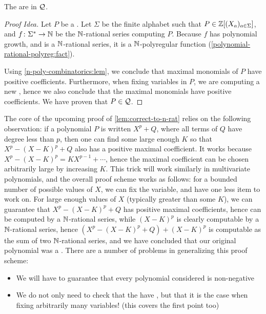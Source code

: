 \documentclass[a4paper,11pt]{article}
\begin{document}
\begin{lemma}
    The  are in $\mathcal{Q}$.
\end{lemma}
\begin{proof}[Proof Idea]
    Let $P$ be a .
    Let $\Sigma$  be the finite alphabet such that
    $P \in \mathbb{Z}[(X_a)_{a \in \Sigma}]$,
    and $f \colon \Sigma^* \to \mathbb{N}$ be the 
    $\mathbb{N}$-rational series computing $P$.
    Because $f$ has polynomial growth, and is a $\mathbb{N}$-rational series,
    it is a $\mathbb{N}$-polyregular function 
    (\cref{polynomial-rational-polyreg:fact}).

    Using \cref{n-poly-combinatorics:lem},
    we conclude that maximal monomials of $P$ have
    positive coefficients. Furthermore, when fixing variables
    in $P$, we are computing a new ,
    hence we also conclude that the maximal monomials have
    positive coefficients.
    We have proven that $P \in \mathcal{Q}$.
\end{proof}



The core of the upcoming proof of \cref{lem:correct-to-n-rat} relies on the
following observation: if a polynomial $P$ is written $X^p + Q$, where all
terms of $Q$ have degree less than $p$, then one can find some large enough $K$
so that $X^p - (X - K)^p + Q$ also has a positive maximal coefficient.
It works because $X^p - (X - K)^p = K X^{p-1} + \cdots$, hence
the maximal coefficient can be chosen arbitrarily large by increasing
$K$.
This
trick will work similarly in multivariate polynomials, and the overall
proof scheme works as follows: for a bounded number of possible
values of $X$, we can fix the variable, and have one less item to work on.
For large enough values of $X$ (typically greater than some $K$), we can guarantee that
$X^p - (X - K)^p + Q$ has positive maximal coefficients, hence
can be computed by a $\mathbb{N}$-rational series, while
$(X - K)^p$ is clearly computable by a $\mathbb{N}$-rational series,
hence $(X^p - (X - K)^p + Q) + (X - K)^p$ is computable
as the sum of two $\mathbb{N}$-rational series, and we have
concluded that our original polynomial was a
. There are a number of problems in generalizing
this proof scheme:
\begin{itemize}
    \item We will have to guarantee that every polynomial considered
        is non-negative
    \item We do not only need to check that the 
        have , but that it is the case
        when fixing arbitrarily many variables! (this
        covers the first point too)
\end{itemize}
\end{document}
